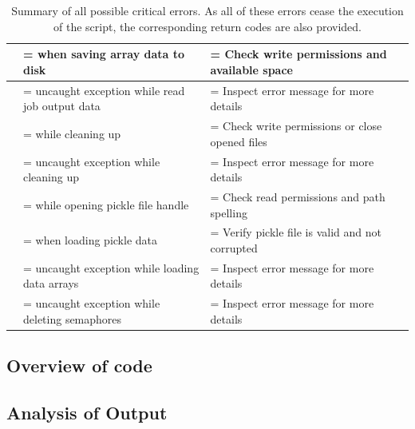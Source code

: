 \begin{table}[h]
\begin{tabularx}{1\linewidth}{|c|>{\hsize\linewidth=\hsize}Y|>{\hsize\linewidth=\hsize}Y|}
 &  when saving array data to disk & Check write permissions and available space \\ \hline
{} & uncaught exception while read job output data & Inspect error message for more details \\ \hline \hline
{} &  while cleaning up & Check write permissions or close opened files \\ \hline
{} & uncaught exception while cleaning up & Inspect error message for more details \\ \hline \hline
{} &  while opening pickle file handle & Check read permissions and path spelling \\ \hline
{} &  when loading pickle data & Verify pickle file is valid and not corrupted \\ \hline
{} & uncaught exception while loading data arrays & Inspect error message for more details \\ \hline \hline
{} & uncaught exception while deleting semaphores & Inspect error message for more details \\ \hline \hline
\end{tabularx}
\caption{Summary of all possible critical errors. As all of these errors cease the execution of the script, the corresponding return codes are also provided.}
\label{tab:my-table}
\end{table}




\subsection{Overview of code}










\subsection{Analysis of Output}




%
